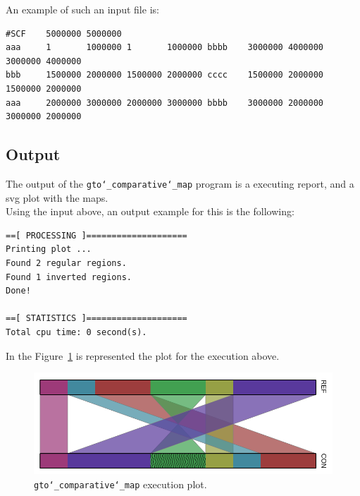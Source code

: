 An example of such an input file is:
\begin{lstlisting}
#SCF    5000000 5000000
aaa     1       1000000 1       1000000 bbbb    3000000 4000000 3000000 4000000
bbb     1500000 2000000 1500000 2000000 cccc    1500000 2000000 1500000 2000000
aaa     2000000 3000000 2000000 3000000 bbbb    3000000 2000000 3000000 2000000
\end{lstlisting}

\subsection*{Output}
The output of the \texttt{gto\char`_comparative\char`_map} program is a executing report, and a svg plot with the maps.\\
Using the input above, an output example for this is the following:
\begin{lstlisting}
==[ PROCESSING ]====================
Printing plot ...
Found 2 regular regions. 
Found 1 inverted regions.
Done!                       

==[ STATISTICS ]====================
Total cpu time: 0 second(s).
\end{lstlisting}

In the Figure~\ref{fig:gtoComparativeMap} is represented the plot for the execution above.

 \begin{figure}[!h]
  \centering
  \includegraphics[scale=0.6]{./images/gto_comparative_map.png}
  \caption{\texttt{gto\char`_comparative\char`_map} execution plot.}
  \label{fig:gtoComparativeMap}
 \end{figure}